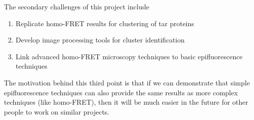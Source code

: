 \documentclass[../main.tex]{subfiles}
\begin{document}
The secondary challenges of this project include
\begin{enumerate}
\item Replicate homo-FRET results for clustering of tar proteins
\item Develop image processing tools for cluster identification
\item Link advanced homo-FRET microscopy techniques to basic epifluorescence techniques
\end{enumerate}
The motivation behind this third point is that if we can demonstrate that simple epifluorescence techniques can also provide the same results as more complex techniques (like homo-FRET), then it will be much easier in the future for other people to work on similar projects.
\end{document}
